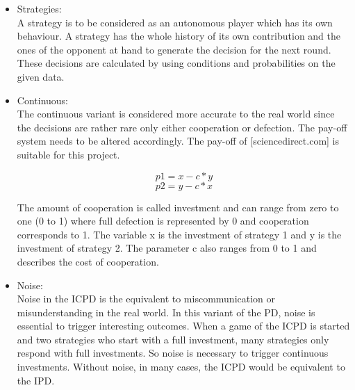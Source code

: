 \documentclass{article}
\begin{document}
\begin{itemize}
	\item Strategies:\\

A strategy is to be considered as an autonomous player which has its own behaviour.
A strategy has the whole history of its own contribution and the ones of the opponent at hand to generate the decision for the next round.
These decisions are calculated by using conditions and probabilities on the given data.\\

	\item Continuous:\\

The continuous variant is considered more accurate to the real world since the decisions are rather rare only either cooperation or defection.
The pay-off system needs to be altered accordingly.
The pay-off of [sciencedirect.com] is suitable for this project.

$$p1 = x - c*y$$
$$p2 = y - c*x$$

The amount of cooperation is called investment and can range from zero to one (0 to 1) where full defection is represented by 0 and cooperation corresponds to 1.
The variable x is the investment of strategy 1 and y is the investment of strategy 2.
The parameter c also ranges from 0 to 1 and describes the cost of cooperation.
\\


	\item Noise:\\

Noise in the ICPD is the equivalent to miscommunication or misunderstanding in the real world.
In this variant of the PD, noise is essential to trigger interesting outcomes.
When a game of the ICPD is started and two strategies who start with a full investment, many strategies only respond with full investments.
So noise is necessary to trigger continuous investments. 
Without noise, in many cases, the ICPD would be equivalent to the IPD.


\end{itemize}
\end{document}
